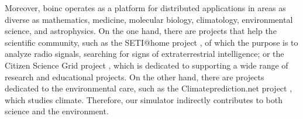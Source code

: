 Moreover, \gls{boinc} operates as a platform for distributed applications in areas as diverse as mathematics, medicine, molecular biology, climatology, environmental science, and astrophysics. On the one hand, there are projects that help the scientific community, such as the SETI@home project \cite{Anderson2002SETI@home}, of which the purpose is to analyze radio signals, searching for signs of extraterrestrial intelligence; or the Citizen Science Grid project \cite{csgproject}, which is dedicated to supporting a wide range of research and educational projects. On the other hand, there are projects dedicated to the environmental care, such as the Climateprediction.net project \cite{climateprediction}, which studies climate. Therefore, our simulator indirectly contributes to both science and the environment.
